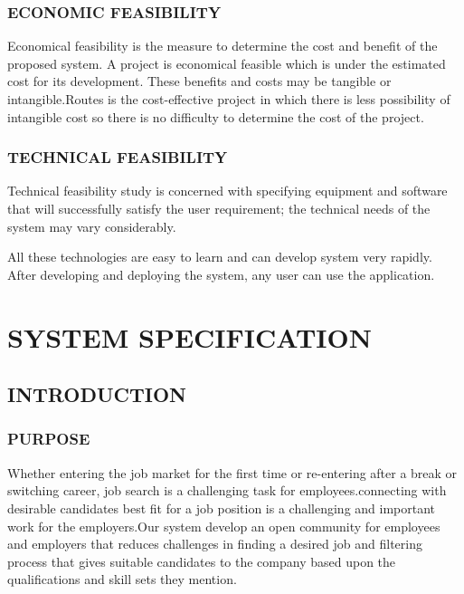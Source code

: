 \documentclass[12pt,a4paper,final]{extreport}
\begin{document}
\subsection{ECONOMIC FEASIBILITY}
\hspace{01.5cm}Economical feasibility is the measure to determine the cost and benefit of the proposed system. A
project is economical feasible which is under the estimated cost for its development. These benefits
and costs may be tangible or intangible.Routes is the cost-effective project in which there is
less possibility of intangible cost so there is no difficulty to determine the cost of the project.

\subsection{TECHNICAL FEASIBILITY}
Technical feasibility study is concerned with specifying equipment and software that will
successfully satisfy the user requirement; the technical needs of the system may vary considerably.
\par All these technologies are easy to learn and can develop system very rapidly. After developing and deploying the system, any user can use the application.

\chapter{SYSTEM SPECIFICATION}
\section{INTRODUCTION}
\subsection{PURPOSE}
\hspace{01.5cm}Whether entering the job market for the first time or re-entering after a break or switching
career, job search is a challenging task for employees.connecting with desirable candidates
best fit for a job position is a challenging and important work for the employers.Our system
develop an open community for employees and employers that reduces challenges in
finding a desired job and filtering process that gives suitable candidates to the company
based upon the qualifications and skill sets they mention.
\\
\\
\\
\end{document}
